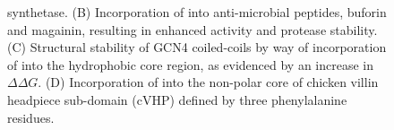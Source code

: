 \begin{refsection}
\begin{figure}[h!]
{        synthetase.\cite{Jackson2007}
        (B)
        Incorporation of  into anti-microbial
        peptides, buforin and magainin, resulting in enhanced activity and
        protease stability.\cite{Meng2007}
        (C) Structural stability of GCN4 coiled-coils by way
        of incorporation of  into the hydrophobic
        core region, as evidenced by an increase in ${\Delta\Delta
        G}$.\cite{Lee2004}
        (D)
        Incorporation of  into the non-polar
        core of chicken villin headpiece sub-domain (cVHP) defined by three
        phenylalanine residues.\cite{Woll2006}}
        \label{fig:fluorination_examples}
    \end{figure}


\end{refsection}
